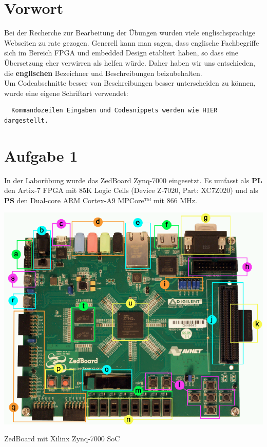 \section{Vorwort}
Bei der Recherche zur Bearbeitung der Übungen wurden viele englischsprachige Webseiten zu rate gezogen. Generell kann man sagen, dass englische Fachbegriffe sich im Bereich FPGA und embedded Design etabliert haben, so dass eine Übersetzung eher verwirren als helfen würde. Daher haben wir uns entschieden, die \textbf{englischen} Bezeichner und Beschreibungen beizubehalten.\\
Um Codeabschnitte besser von Beschreibungen besser unterscheiden zu können, wurde eine eigene Schriftart verwendet:
\begin{verbatim}
  Kommandozeilen Eingaben und Codesnippets werden wie HIER dargestellt.
\end{verbatim}

\section{Aufgabe 1} \label{ex1}
In der Laborübung wurde das ZedBoard Zynq-7000 eingesetzt. Es umfasst als \textbf{PL} den Artix-7 FPGA mit 85K Logic Cells (Device Z-7020, Part: XC7Z020) und als \textbf{PS} den Dual-core ARM Cortex-A9 MPCore™ mit 866 MHz.

\begin{minipage}{\textwidth}
    \begin{center}        
        \includegraphics[scale=0.5]{img/a1.png} 
    \end{center}
\end{minipage}
\begin{center}
ZedBoard mit Xilinx Zynq-7000 SoC
\end{center}

